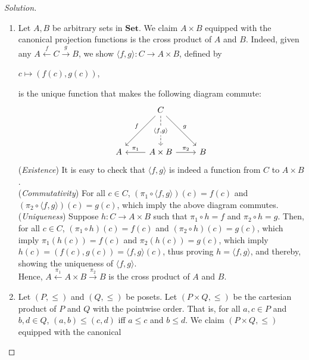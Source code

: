 \documentclass[]{amsbook}
\newcommand{\catname}[1]{\mathbf{#1}}
\newcommand{\0}{\mathbf{0}}
\newcommand{\1}{\mathbf{1}}
\newenvironment{solution}
    {\begin{proof}[Solution]}{\end{proof}}
\begin{document}
\begin{solution}
    \leavevmode
    \begin{enumerate}
        \item Let $A, B$ be arbitrary sets in $\catname{Set}$. We claim
        $A \times B$ equipped with the canonical projection functions is the
        cross product of $A$ and $B$. Indeed, given any $A \xleftarrow{f} C
        \xrightarrow{g} B$, we show $\langle f, g \rangle : C \to A \times B$,
        defined by
        \begin{center}
            $c \mapsto (f(c), g(c))$,
        \end{center}
        is the unique function that makes the following diagram commute:
        \[
        \begin{tikzcd}
            & C \arrow[ddl, swap, "f"]
                \arrow[dd, dashrightarrow, "{\langle f, g \rangle}" description]
                \arrow[ddr, "g"] & \\
            & & \\
            A & A \times B \arrow[l, swap, "\pi_1"] \arrow[r, "\pi_2"] & B
        \end{tikzcd}
        \]
        (\emph{Existence}) It is easy to check that $\langle f, g \rangle$ is
        indeed a function from $C$ to $A \times B$.\\
        (\emph{Commutativity}) For all $c \in C$, $(\pi_1 \circ \langle f, g
        \rangle)(c) = f(c)$ and $(\pi_2 \circ   \langle f, g \rangle)(c) = g(c)$,
        which imply the above diagram commutes.\\
        (\emph{Uniqueness}) Suppose $h: C \to A \times B$ such that $\pi_1 \circ
        h = f$ and $\pi_2 \circ h = g$. Then, for all $c \in C$, $(\pi_1 \circ
        h)(c) = f(c)$ and $(\pi_2 \circ h)(c) = g(c)$, which imply $\pi_1(h(c)) =
        f(c)$ and $\pi_2(h(c)) = g(c)$, which imply $h(c) = (f(c), g(c)) =
        \langle f, g \rangle (c)$, thus proving $h = \langle f, g \rangle$, and
        thereby, showing the uniqueness of $\langle f, g \rangle$.\\
        Hence, $A \xleftarrow{\pi_1} A \times B \xrightarrow{\pi_2} B$ is the
        cross product of $A$ and $B$.
        \item Let $(P, \le)$ and $(Q, \le)$ be posets. Let $(P \times Q, \le)$ be
        the cartesian product of $P$ and $Q$ with the pointwise order. That is,
        for all $a, c \in P$ and $b, d \in Q$, $(a, b) \le (c, d)$ iff $a \le c$
        and $b \le d$. We claim $(P \times Q, \le)$ equipped with the canonical

\end{enumerate}
\end{solution}
\end{document}
